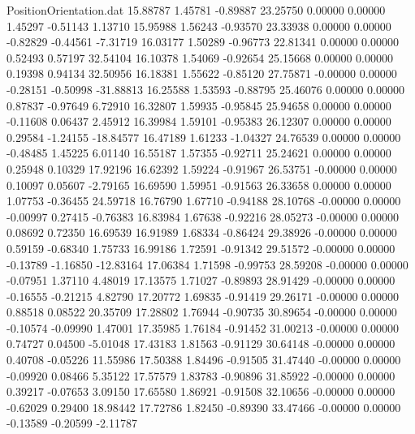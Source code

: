 \begin{filecontents}{PositionOrientation.dat}
  15.88787    1.45781   -0.89887    23.25750    0.00000    0.00000    1.45297   -0.51143    1.13710
  15.95988    1.56243   -0.93570    23.33938    0.00000    0.00000   -0.82829   -0.44561   -7.31719
  16.03177    1.50289   -0.96773    22.81341    0.00000    0.00000    0.52493    0.57197   32.54104
  16.10378    1.54069   -0.92654    25.15668    0.00000    0.00000    0.19398    0.94134   32.50956
  16.18381    1.55622   -0.85120    27.75871   -0.00000    0.00000   -0.28151   -0.50998  -31.88813
  16.25588    1.53593   -0.88795    25.46076    0.00000    0.00000    0.87837   -0.97649    6.72910
  16.32807    1.59935   -0.95845    25.94658    0.00000    0.00000   -0.11608    0.06437    2.45912
  16.39984    1.59101   -0.95383    26.12307    0.00000    0.00000    0.29584   -1.24155  -18.84577
  16.47189    1.61233   -1.04327    24.76539    0.00000    0.00000   -0.48485    1.45225    6.01140
  16.55187    1.57355   -0.92711    25.24621    0.00000    0.00000    0.25948    0.10329   17.92196
  16.62392    1.59224   -0.91967    26.53751   -0.00000    0.00000    0.10097    0.05607   -2.79165
  16.69590    1.59951   -0.91563    26.33658    0.00000    0.00000    1.07753   -0.36455   24.59718
  16.76790    1.67710   -0.94188    28.10768   -0.00000    0.00000   -0.00997    0.27415   -0.76383
  16.83984    1.67638   -0.92216    28.05273   -0.00000    0.00000    0.08692    0.72350   16.69539
  16.91989    1.68334   -0.86424    29.38926   -0.00000    0.00000    0.59159   -0.68340    1.75733
  16.99186    1.72591   -0.91342    29.51572   -0.00000    0.00000   -0.13789   -1.16850  -12.83164
  17.06384    1.71598   -0.99753    28.59208   -0.00000    0.00000   -0.07951    1.37110    4.48019
  17.13575    1.71027   -0.89893    28.91429   -0.00000    0.00000   -0.16555   -0.21215    4.82790
  17.20772    1.69835   -0.91419    29.26171   -0.00000    0.00000    0.88518    0.08522   20.35709
  17.28802    1.76944   -0.90735    30.89654   -0.00000    0.00000   -0.10574   -0.09990    1.47001
  17.35985    1.76184   -0.91452    31.00213   -0.00000    0.00000    0.74727    0.04500   -5.01048
  17.43183    1.81563   -0.91129    30.64148   -0.00000    0.00000    0.40708   -0.05226   11.55986
  17.50388    1.84496   -0.91505    31.47440   -0.00000    0.00000   -0.09920    0.08466    5.35122
  17.57579    1.83783   -0.90896    31.85922   -0.00000    0.00000    0.39217   -0.07653    3.09150
  17.65580    1.86921   -0.91508    32.10656   -0.00000    0.00000   -0.62029    0.29400   18.98442
  17.72786    1.82450   -0.89390    33.47466   -0.00000    0.00000   -0.13589   -0.20599   -2.11787

\end{filecontents}
